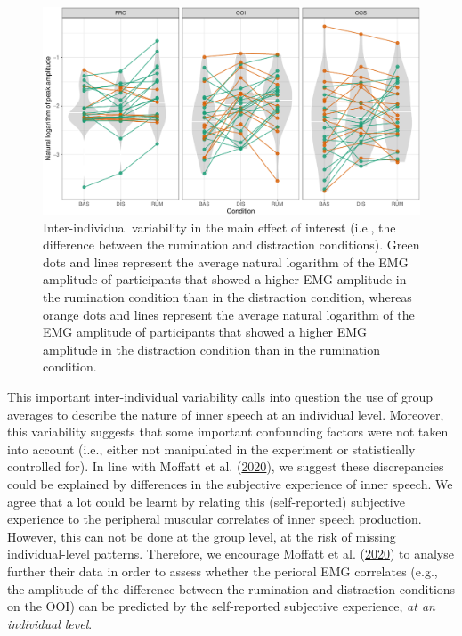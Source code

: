 \documentclass[
  english,
  man, donotrepeattitle,floatsintext]{apa6}
\begin{document}
\begin{figure}[!htb]

{\centering \includegraphics[width=1\linewidth]{manuscript_files/figure-latex/everyone-1} 

}

\caption{Inter-individual variability in the main effect of interest (i.e., the difference between the rumination and distraction conditions). Green dots and lines represent the average natural logarithm of the EMG amplitude of participants that showed a higher EMG amplitude in the rumination condition than in the distraction condition, whereas orange dots and lines represent the average natural logarithm of the EMG amplitude of participants that showed a higher EMG amplitude in the distraction condition than in the rumination condition.}\label{fig:everyone}
\end{figure}

This important inter-individual variability calls into question the use of group averages to describe the nature of inner speech at an individual level. Moreover, this variability suggests that some important confounding factors were not taken into account (i.e., either not manipulated in the experiment or statistically controlled for). In line with Moffatt et al. (\protect\hyperlink{ref-moffatt_inner_2020}{2020}), we suggest these discrepancies could be explained by differences in the subjective experience of inner speech. We agree that a lot could be learnt by relating this (self-reported) subjective experience to the peripheral muscular correlates of inner speech production. However, this can not be done at the group level, at the risk of missing individual-level patterns. Therefore, we encourage Moffatt et al. (\protect\hyperlink{ref-moffatt_inner_2020}{2020}) to analyse further their data in order to assess whether the perioral EMG correlates (e.g., the amplitude of the difference between the rumination and distraction conditions on the OOI) can be predicted by the self-reported subjective experience, \emph{at an individual level}.
\end{document}
